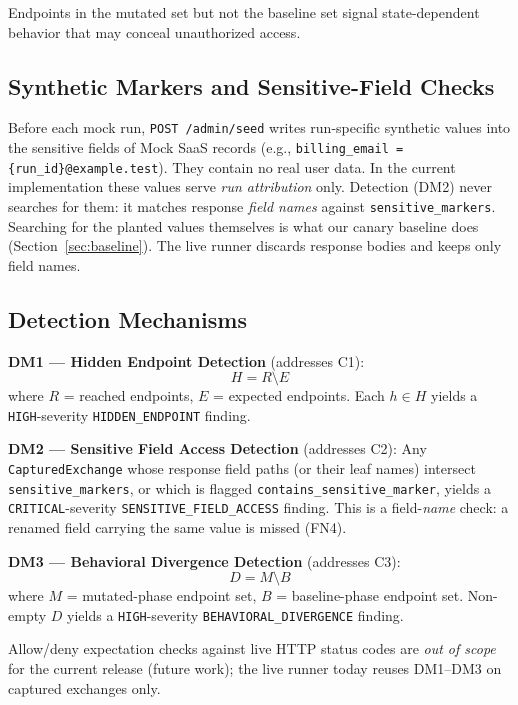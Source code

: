 \documentclass[conference]{IEEEtran}
\begin{document}
Endpoints in the mutated set but not the baseline set signal
state-dependent behavior that may conceal unauthorized access.

\subsection{Synthetic Markers and Sensitive-Field Checks}

Before each mock run, \texttt{POST /admin/seed} writes run-specific
synthetic values into the sensitive fields of Mock SaaS records (e.g.,
\texttt{billing\_email = \{run\_id\}@example.test}). They contain no
real user data. In the current implementation these values serve
\emph{run attribution} only. Detection (DM2) never searches for them:
it matches response \emph{field names} against
\texttt{sensitive\_markers}. Searching for the planted values themselves
is what our canary baseline does (Section~\ref{sec:baseline}). The live
runner discards response bodies and keeps only field names.

\subsection{Detection Mechanisms}

\textbf{DM1 --- Hidden Endpoint Detection} (addresses C1):
\begin{equation}
  H = R \setminus E
  \label{eq:hidden}
\end{equation}
where $R$ = reached endpoints, $E$ = expected endpoints. Each $h \in H$
yields a \texttt{HIGH}-severity \texttt{HIDDEN\_ENDPOINT} finding.

\textbf{DM2 --- Sensitive Field Access Detection} (addresses C2):
Any \texttt{CapturedExchange} whose response field paths (or their leaf
names) intersect \texttt{sensitive\_markers}, or which is flagged
\texttt{contains\_sensitive\_marker}, yields a \texttt{CRITICAL}-severity
\texttt{SENSITIVE\_FIELD\_ACCESS} finding. This is a field-\emph{name}
check: a renamed field carrying the same value is missed (FN4).

\textbf{DM3 --- Behavioral Divergence Detection} (addresses C3):
\begin{equation}
  D = M \setminus B
  \label{eq:divergence}
\end{equation}
where $M$ = mutated-phase endpoint set, $B$ = baseline-phase endpoint
set. Non-empty $D$ yields a \texttt{HIGH}-severity
\texttt{BEHAVIORAL\_DIVERGENCE} finding.

Allow/deny expectation checks against live HTTP status codes are
\emph{out of scope} for the current release (future work); the live
runner today reuses DM1--DM3 on captured exchanges only.
\end{document}
